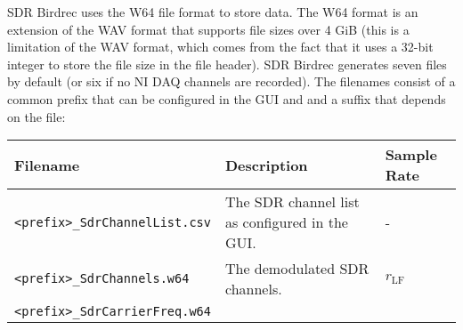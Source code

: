 \documentclass[10pt]{article}
\begin{document}
SDR Birdrec uses the W64 file format to store data. The W64 format is an
extension of the WAV format that supports file sizes over 4 GiB (this is
a limitation of the WAV format, which comes from the fact that it uses a
32-bit integer to store the file size in the file header). SDR Birdrec
generates seven files by default (or six if no NI DAQ channels are
recorded). The filenames consist of a common prefix that can be
configured in the GUI and and a suffix that depends on the file:
\begin{longtable}[]{@{}lll@{}}
\toprule
\begin{minipage}[b]{0.13\columnwidth}\raggedright\strut
Filename\strut
\end{minipage} & \begin{minipage}[b]{0.18\columnwidth}\raggedright\strut
Description\strut
\end{minipage} & \begin{minipage}[b]{0.18\columnwidth}\raggedright\strut
Sample Rate\strut
\end{minipage}\tabularnewline
\midrule
\endhead
\begin{minipage}[t]{0.13\columnwidth}\raggedright\strut
\texttt{\textless{}prefix\textgreater{}\_SdrChannelList.csv}\strut
\end{minipage} & \begin{minipage}[t]{0.18\columnwidth}\raggedright\strut
The SDR channel list as configured in the GUI.\strut
\end{minipage} & \begin{minipage}[t]{0.18\columnwidth}\raggedright\strut
-\strut
\end{minipage}\tabularnewline
\begin{minipage}[t]{0.13\columnwidth}\raggedright\strut
\texttt{\textless{}prefix\textgreater{}\_SdrChannels.w64}\strut
\end{minipage} & \begin{minipage}[t]{0.18\columnwidth}\raggedright\strut
The demodulated SDR channels.\strut
\end{minipage} & \begin{minipage}[t]{0.18\columnwidth}\raggedright\strut
\(r_\text{LF}\)\strut
\end{minipage}\tabularnewline
\begin{minipage}[t]{0.13\columnwidth}\raggedright\strut
\texttt{\textless{}prefix\textgreater{}\_SdrCarrierFreq.w64}\strut
\end{minipage} & \begin{minipage}[t]{0.18\columnwidth}\raggedright\strut

\end{minipage}
\end{longtable}
\end{document}
